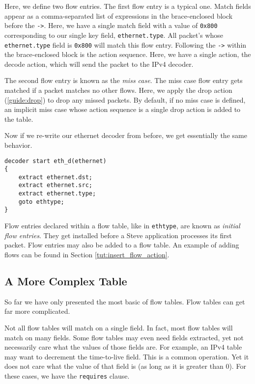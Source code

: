 Here, we define two flow entries. The first flow entry is a typical one. Match
fields appear as a comma-separated list of expressions in the brace-enclosed
block before the \texttt{->}. Here, we have a single match field with a value of
\texttt{0x800} corresponding to our single key field, \texttt{ethernet.type}.
All packet's whose \texttt{ethernet.type} field is \texttt{0x800} will match
this flow entry. Following the \texttt{->} within the brace-enclosed block is
the action sequence. Here, we have a single action, the decode action, which
will send the packet to the IPv4 decoder.

The second flow entry is known as the \textit{miss case}. The miss case flow
entry gets matched if a packet matches no other flows. Here, we apply the drop
action (\ref{guide:drop}) to drop any missed packets. By default, if no miss
case is defined, an implicit miss case whose action sequence is a single drop
action is added to the table.

Now if we re-write our ethernet decoder from before, we get essentially the same
behavior.

\begin{codepage}
\begin{lstlisting}
decoder start eth_d(ethernet)
{
	extract ethernet.dst;
	extract ethernet.src;
	extract ethernet.type;
	goto ethtype;
}
\end{lstlisting}
\end{codepage}

Flow entries declared within a flow table, like in \texttt{ethtype}, are known
as \textit{initial flow entries}. They get installed before a Steve application
processes its first packet. Flow entries may also be added to a flow table. An
example of adding flows can be found in Section \ref{tut:insert_flow_action}.

\subsection{A More Complex Table} \label{tut:complex_table}

So far we have only presented the most basic of flow tables. Flow tables can get
far more complicated.

Not all flow tables will match on a single field. In fact, most flow tables will
match on many fields. Some flow tables may even need fields extracted, yet not
necessarily care what the values of those fields are. For example, an IPv4 table
may want to decrement the time-to-live field. This is a common operation. Yet it
does not care what the value of that field is (as long as it is greater than 0).
For these cases, we have the \texttt{requires} clause.

